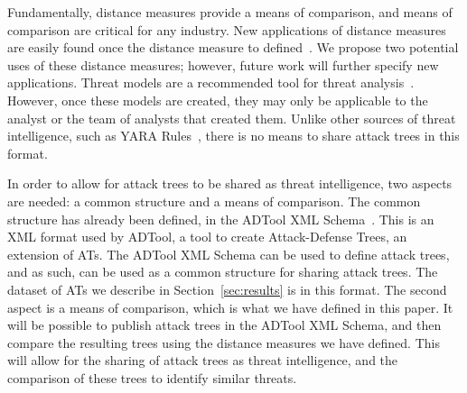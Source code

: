\begin{definition}
\end{definition}

Fundamentally, distance measures provide a means of comparison, and means of comparison are critical for any industry. New applications of distance measures are easily found once the distance measure to defined~\cite{beham2011new}. We propose two potential uses of these distance measures; however, future work will further specify new applications. Threat models are a recommended tool for threat analysis~\cite{andersonSecurityEngineeringGuide2020,schneierSecretsLiesDigital2000}. However, once these models are created, they may only be applicable to the analyst or the team of analysts that created them. Unlike other sources of threat intelligence, such as YARA Rules~\cite{naik2019cyberthreat,naik2020evaluating}, there is no means to share attack trees in this format.

In order to allow for attack trees to be shared as threat intelligence, two aspects are needed: a common structure and a means of comparison. The common structure has already been defined, in the ADTool XML Schema~\cite{kordy_adtool_2013}. This is an XML format used by ADTool, a tool to create Attack-Defense Trees, an extension of ATs. The ADTool XML Schema can be used to define attack trees, and as such, can be used as a common structure for sharing attack trees. The dataset of ATs we describe in Section~\ref{sec:results} is in this format. The second aspect is a means of comparison, which is what we have defined in this paper. It will be possible to publish attack trees in the ADTool XML Schema, and then compare the resulting trees using the distance measures we have defined. This will allow for the sharing of attack trees as threat intelligence, and the comparison of these trees to identify similar threats.

